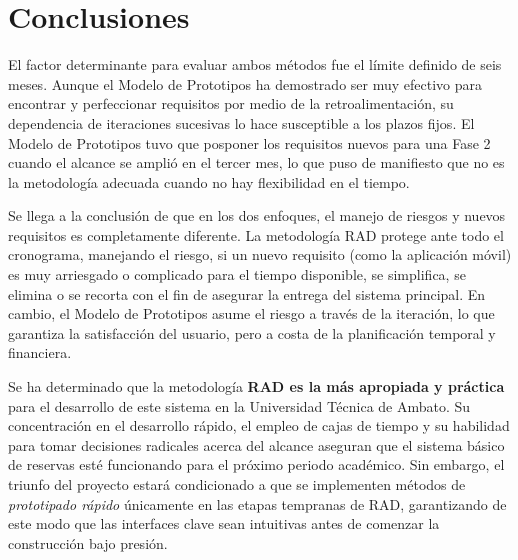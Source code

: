 \documentclass[pdflatex,sn-mathphys-num]{sn-jnl}%
\theoremstyle{thmstyleone}%
\theoremstyle{thmstyletwo}%
\theoremstyle{thmstylethree}%
\begin{document}
\section{Conclusiones}
El factor determinante para evaluar ambos métodos fue el límite definido de seis meses. Aunque el Modelo de Prototipos ha demostrado ser muy efectivo para encontrar y perfeccionar requisitos por medio de la retroalimentación, su dependencia de iteraciones sucesivas lo hace susceptible a los plazos fijos. El Modelo de Prototipos tuvo que posponer los requisitos nuevos para una Fase 2 cuando el alcance se amplió en el tercer mes, lo que puso de manifiesto que no es la metodología adecuada cuando no hay flexibilidad en el tiempo.

Se llega a la conclusión de que en los dos enfoques, el manejo de riesgos y nuevos requisitos es completamente diferente. La metodología RAD protege ante todo el cronograma, manejando el riesgo, si un nuevo requisito (como la aplicación móvil) es muy arriesgado o complicado para el tiempo disponible, se simplifica, se elimina o se recorta con el fin de asegurar la entrega del sistema principal. En cambio, el Modelo de Prototipos asume el riesgo a través de la iteración, lo que garantiza la satisfacción del usuario, pero a costa de la planificación temporal y financiera.


Se ha determinado que la metodología \textbf{RAD es la más apropiada y práctica} para el desarrollo de este sistema en la Universidad Técnica de Ambato. Su concentración en el desarrollo rápido, el empleo de cajas de tiempo y su habilidad para tomar decisiones radicales acerca del alcance aseguran que el sistema básico de reservas esté funcionando para el próximo periodo académico. Sin embargo, el triunfo del proyecto estará condicionado a que se implementen métodos de \textit{prototipado rápido} únicamente en las etapas tempranas de RAD, garantizando de este modo que las interfaces clave sean intuitivas antes de comenzar la construcción bajo presión.
\end{document}
